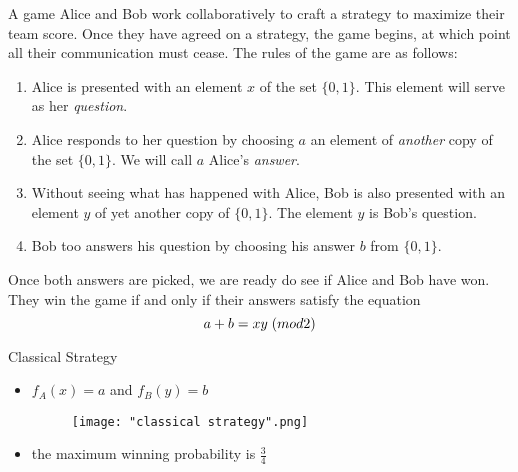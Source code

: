 \documentclass[handout, 10 pt]{beamer}
\begin{document}
\begin{comment}
In many collaborative games, two players using a {\emph{quantum strategy}} can achieve a higher winning probability than if they use a {\emph{classical strategy}}. Because of this, many probabilistic games can be thought of as tests for entanglement.  This also illustrates why one might try to make use of quantum mechanics in cryptography.  We illustrate this phenomenon with an example of a guessing game.
\end{comment}

\begin{frame}{A game}
Alice and Bob work collaboratively to craft a strategy to maximize their team score.  Once they have agreed on a strategy, the game begins, at which point all their communication must cease.  The rules of the game are as follows:
\pause
\begin{enumerate}
\item Alice is presented with an element $x$ of the set $\{0,1\}$.  This element will serve as her {\emph{question}}.
\pause
\item Alice responds to her question by choosing $a$ an element of {\emph{another}} copy of the set $\{0,1\}$.  We will call $a$ Alice's {\emph{answer}}. \pause
\item Without seeing what has happened with Alice, Bob is also presented with an element $y$ of yet another copy of $\{0,1\}$. The element $y$ is Bob's question.
\pause
\item Bob too answers his question by choosing his answer $b$ from $\{0,1\}$.
\end{enumerate}
\pause
Once both answers are picked, we are ready do see if Alice and Bob have won.  They win the game if and only if their answers satisfy the equation
\begin{equation*}
 a+b =xy\hspace{.1cm}(mod 2) 
\end{equation*}
\end{frame}

\begin{frame}{Classical Strategy}
\begin{itemize}
    \item $f_A(x)=a$ and $f_B(y)=b$
    \begin{figure}[h]
    \centering
    \texttt{[image: "classical strategy".png]}
    \label{fig: classical strategy diagram}
    \end{figure}
    \item the maximum winning probability is $\frac{3}{4}$
\end{itemize}
\end{frame}
\end{document}
